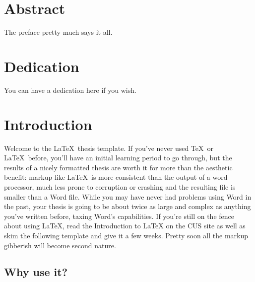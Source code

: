 \documentclass[12pt,twoside]{reedthesis}
\begin{document}
    \chapter*{Abstract}
	The preface pretty much says it all.
	
	\chapter*{Dedication}
	You can have a dedication here if you wish.

  \mainmatter %
  \pagestyle{fancyplain} %


    \chapter*{Introduction}

	
	Welcome to the \LaTeX\ thesis template. If you've never used \TeX\ or \LaTeX\ before, you'll have an initial learning period to go through, but the results of a nicely formatted thesis are worth it for more than the aesthetic benefit: markup like \LaTeX\ is more consistent than the output of a word processor, much less prone to corruption or crashing and the resulting file is smaller than a Word file. While you may have never had problems using Word in the past, your thesis is going to be about twice as large and complex as anything you've written before, taxing Word's capabilities. If you're still on the fence about  using \LaTeX, read the Introduction to LaTeX on the CUS site as well as skim the following template and give it a few weeks. Pretty soon all the markup gibberish will become second nature.

\section{Why use it?}
	
\end{document}
